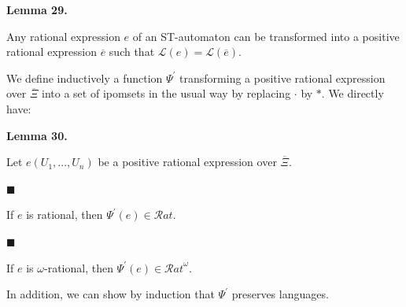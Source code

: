 \documentclass[10pt,a4paper]{article}
\begin{document}
 
 
\par\medskip\noindent\textbf{Lemma 29.}\par
 
 
Any rational expression $e$ of an ST-automaton can be transformed into a positive rational expression $\overline{e}$ such that $\mathcal{L}(e)=\mathcal{L}(\overline{e})$.\par
 
 
 
 
We define inductively a function $\Psi^{\prime}$ transforming a positive rational expression over $\overline{\Xi}$ into a set of ipomsets in the usual way by replacing $\cdot$ by $*$. We directly have:\par
 
 
 
\par\medskip\noindent\textbf{Lemma 30.}\par
 
 
Let $e(U_{1},...,U_{n})$ be a positive rational expression over $\overline{\Xi}$.\par
  
\par\noindent  $\blacksquare$ 
 
If $e$ is rational, then $\Psi^{\prime}(e)\in\mathcal{R}at$.\par
 
 
 
\par\noindent  $\blacksquare$ 
 
If $e$ is $\omega$-rational, then $\Psi^{\prime}(e)\in{\mathcal{R}at}^{\omega}$.\par
 
 
  
 
 
 
In addition, we can show by induction that $\Psi^{\prime}$ preserves languages.\par
 
\end{document}
